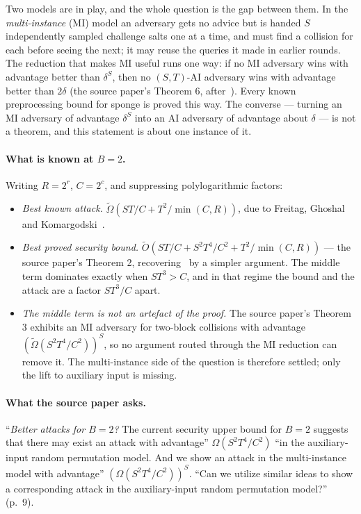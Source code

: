 \documentclass{conjura-conjecture}
\newcommand{\tO}{\tilde{O}}
\newcommand{\tOm}{\tilde{\Omega}}
\begin{document}
Two models are in play, and the whole question is the gap between them.
In the \emph{multi-instance} (MI) model an adversary gets no advice but
is handed $S$ independently sampled challenge salts one at a time, and
must find a collision for each before seeing the next; it may reuse the
queries it made in earlier rounds. The reduction that makes MI useful
runs one way: if no MI adversary wins with advantage better than
$\delta^{S}$, then no $(S,T)$-AI adversary wins with advantage better
than $2\delta$ (the source paper's Theorem 6, after~\cite{AGL22}). Every
known preprocessing bound for sponge is proved this way. The converse
--- turning an MI adversary of advantage $\delta^{S}$ into an AI
adversary of advantage about $\delta$ --- is not a theorem, and this
statement is about one instance of it.

\paragraph{What is known at $B = 2$.}
Writing $R = 2^{r}$, $C = 2^{c}$, and suppressing polylogarithmic
factors:

\begin{itemize}
\item \emph{Best known attack.} $\tOm(ST/C + T^{2}/\min(C,R))$, due to
  Freitag, Ghoshal and Komargodski~\cite{FGK22}.
\item \emph{Best proved security bound.}
  $\tO(ST/C + S^{2}T^{4}/C^{2} + T^{2}/\min(C,R))$ --- the source
  paper's Theorem 2, recovering~\cite{FGK22} by a simpler argument. The
  middle term dominates exactly when $ST^{3} > C$, and in that regime
  the bound and the attack are a factor $ST^{3}/C$ apart.
\item \emph{The middle term is not an artefact of the proof.} The
  source paper's Theorem 3 exhibits an MI adversary for two-block
  collisions with advantage $(\tOm(S^{2}T^{4}/C^{2}))^{S}$, so no
  argument routed through the MI reduction can remove it. The
  multi-instance side of the question is therefore settled; only the
  lift to auxiliary input is missing.
\end{itemize}

\paragraph{What the source paper asks.}
``\emph{Better attacks for $B = 2$?} The current security upper bound
for $B = 2$ suggests that there may exist an attack with advantage''
$\Omega(S^{2}T^{4}/C^{2})$ ``in the auxiliary-input random permutation
model. And we show an attack in the multi-instance model with
advantage'' $(\Omega(S^{2}T^{4}/C^{2}))^{S}$. ``Can we utilize similar
ideas to show a corresponding attack in the auxiliary-input random
permutation model?'' (p.~9).
\end{document}
